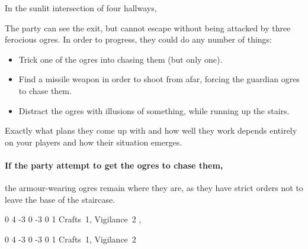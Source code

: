 \begin{multicols}{2}

\begin{boxtext}

  In the sunlit intersection of four hallways,
  \iftoggle{hardcore}%
    {four ogres sit playing a game of dice.  Two are clad in black leather armour, with a massive sword by their side.
    Another sucks on a horse's uncooked head, while the third goes for a piss behind the staircase.}%
    {three ogres sit playing dice.
    Two are clad in black, leather armour, apparently pieced together from multiple suits.
    The third sits watching them play some dice game.}%

\end{boxtext}

The party can see the exit, but cannot escape without being attacked by three ferocious ogres.
In order to progress, they could do any number of things:

\begin{itemize}

  \item{Trick one of the ogres into chasing them (but only one).}
  \item{Find a missile weapon in order to shoot from afar, forcing the guardian ogres to chase them.}
  \item{Distract the ogres with illusions of something, while running up the stairs.}

\end{itemize}

Exactly what plans they come up with and how well they work depends entirely on your players and how their situation emerges.

\paragraph{If the party attempt to get the ogres to chase them,}
the armour-wearing ogres remain where they are, as they have strict orders not to leave the base of the staircase.


{0}%
{4}%
{{-3}%
{0}%
{-3}}%
{0}%
{1}%
{Crafts~1, Vigilance~2}%
{\greatsword, \partialleather}%
{}


\label{chasingogre}

{0}%
{4}%
{{-3}%
{0}%
{-3}}%
{0}%
{1}%
{Crafts~1, Vigilance~2}%
{\greatclub}%
{}


\end{multicols}
